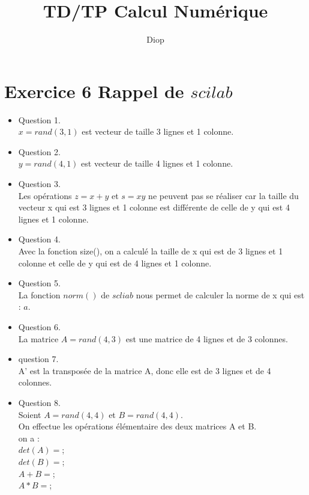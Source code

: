 \documentclass[]{article}
\title{TD/TP Calcul Numérique}
\author{Diop}
\begin{document}
\section{Exercice 6 Rappel de $ scilab$}
\begin{itemize}
\item {Question 1. \\}
$ x = rand(3,1) $ est vecteur de taille 3 lignes et 1 colonne.\\
\item {Question 2. \\}
$ y = rand(4,1) $ est vecteur de taille 4 lignes et 1 colonne.\\

\item {Question 3. \\}
Les opérations $ z = x + y$ et $ s = xy$ ne peuvent pas se réaliser car la taille du vecteur x qui est 3 lignes et 1 colonne est différente de celle de y qui est 4 lignes et 1 colonne.\\

\item {Question 4. \\}
Avec la fonction size(), on a calculé la taille de x qui est de  3 lignes et 1 colonne et celle de y qui est de 4 lignes et 1 colonne.\\

\item {Question 5. \\}
La fonction $norm()$ de $scliab$ nous permet de calculer la norme de x qui est : $a$.\\

\item {Question 6. \\} 
La matrice $ A = rand(4,3) $ est une matrice de 4 lignes et de 3 colonnes.\\

\item {question 7. \\}
A' est la transposée de la matrice A, donc elle est de 3 lignes et de 4 colonnes.\\

\item {Question 8. \\}
Soient $ A = rand(4,4) $ et $ B = rand(4,4) $.\\
On effectue les opérations élémentaire des deux matrices A et B.\\
on a :\\
$ det(A) = $;\\
$ det(B) = $;\\
$A + B = $;\\
$A*B = $;\\


\end{itemize}
\end{document}
